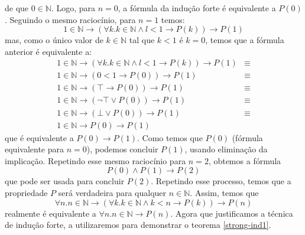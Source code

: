de que $0\in\mathbb{N}$. Logo, para $n = 0$, a fórmula da indução
forte é equivalente a $P(0)$. Seguindo o mesmo raciocínio, para $n =
1$ temos:
\[
1\in\mathbb{N}\to (\forall k. k\in \mathbb{N} \land l < 1 \to P(k))
\to P(1)
\]
mas, como o único valor de $k\in\mathbb{N}$ tal que $k < 1$ é $k = 0$,
temos que a fórmula anterior é equivalente a:
\[
\begin{array}{lc}
1\in\mathbb{N}\to (\forall k. k\in \mathbb{N} \land l < 1 \to P(k))
\to P(1) & \equiv \\
1\in\mathbb{N}\to (0 < 1 \to P(0))
\to P(1) & \equiv \\
1\in\mathbb{N}\to (\top \to P(0))
\to P(1) & \equiv \\
1\in\mathbb{N}\to (\neg \top \lor P(0))
\to P(1) & \equiv \\
1\in\mathbb{N}\to (\bot \lor P(0))
\to P(1) & \equiv \\
1\in\mathbb{N} \to P(0) \to P(1)
\end{array}
\]
que é equivalente a $P(0) \to P(1)$. Como temos que $P(0)$ (fórmula
equivalente para $n = 0$), podemos concluir $P(1)$, usando eliminação
da implicação. Repetindo esse mesmo raciocínio para $n = 2$, obtemos a
fórmula
\[
P(0) \land P(1) \to P(2)
\]
que pode ser usada para concluir $P(2)$. Repetindo esse processo,
temos que a propriedade $P$ será verdadeira para qualquer $n
\in\mathbb{N}$. Assim, temos que
\[
\forall n. n\in\mathbb{N} \to (\forall k. k\in\mathbb{N} \land k < n
\to P(k)) \to P(n)
\]
realmente é equivalente a $\forall n.n\in\mathbb{N}\to P(n)$.
Agora que justificamos a técnica de indução forte, a utilizaremos para
demonstrar o teorema \ref{strong-ind1}.

